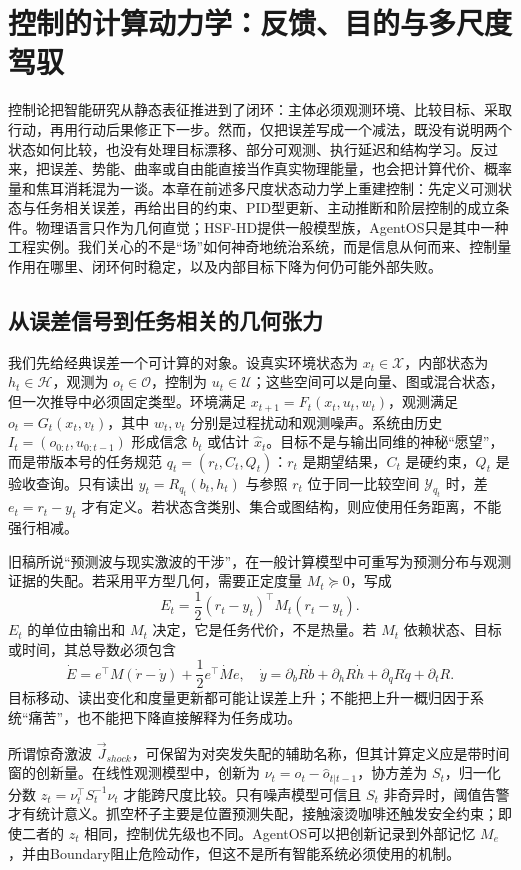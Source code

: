 \chapter{控制的计算动力学：反馈、目的与多尺度驾驭}
\label{chp:physics_of_cybernetics}

控制论把智能研究从静态表征推进到了闭环：主体必须观测环境、比较目标、采取行动，再用行动后果修正下一步。然而，仅把误差写成一个减法，既没有说明两个状态如何比较，也没有处理目标漂移、部分可观测、执行延迟和结构学习。反过来，把误差、势能、曲率或自由能直接当作真实物理能量，也会把计算代价、概率量和焦耳消耗混为一谈。本章在前述多尺度状态动力学上重建控制：先定义可测状态与任务相关误差，再给出目的约束、PID型更新、主动推断和阶层控制的成立条件。物理语言只作为几何直觉；HSF-HD提供一般模型族，AgentOS只是其中一种工程实例。我们关心的不是“场”如何神奇地统治系统，而是信息从何而来、控制量作用在哪里、闭环何时稳定，以及内部目标下降为何仍可能外部失败。

\section{从误差信号到任务相关的几何张力}
\label{sec:wiener_ghost_geometric_tension}

我们先给经典误差一个可计算的对象。设真实环境状态为 $x_t\in\mathcal X$，内部状态为 $h_t\in\mathcal H$，观测为 $o_t\in\mathcal O$，控制为 $u_t\in\mathcal U$；这些空间可以是向量、图或混合状态，但一次推导中必须固定类型。环境满足 $x_{t+1}=F_t(x_t,u_t,w_t)$，观测满足 $o_t=G_t(x_t,v_t)$，其中 $w_t,v_t$ 分别是过程扰动和观测噪声。系统由历史 $I_t=(o_{0:t},u_{0:t-1})$ 形成信念 $b_t$ 或估计 $\hat x_t$。目标不是与输出同维的神秘“愿望”，而是带版本号的任务规范 $q_t=(r_t,C_t,Q_t)$：$r_t$ 是期望结果，$C_t$ 是硬约束，$Q_t$ 是验收查询。只有读出 $y_t=R_{q_t}(b_t,h_t)$ 与参照 $r_t$ 位于同一比较空间 $\mathcal Y_{q_t}$ 时，差 $e_t=r_t-y_t$ 才有定义。若状态含类别、集合或图结构，则应使用任务距离，不能强行相减。

旧稿所说“预测波与现实激波的干涉”，在一般计算模型中可重写为预测分布与观测证据的失配。若采用平方型几何，需要正定度量 $M_t\succeq0$，写成
\[
 E_t=\frac12(r_t-y_t)^\top M_t(r_t-y_t).
\]
$E_t$ 的单位由输出和 $M_t$ 决定，它是任务代价，不是热量。若 $M_t$ 依赖状态、目标或时间，其总导数必须包含
\[
 \dot E=e^\top M(\dot r-\dot y)+\frac12e^\top\dot M e,
 \quad \dot y=\partial_bR\dot b+\partial_hR\dot h+\partial_qR\dot q+\partial_tR.
\]
目标移动、读出变化和度量更新都可能让误差上升；不能把上升一概归因于系统“痛苦”，也不能把下降直接解释为任务成功。

所谓惊奇激波 $\vec J_{shock}$，可保留为对突发失配的辅助名称，但其计算定义应是带时间窗的创新量。在线性观测模型中，创新为 $\nu_t=o_t-\hat o_{t|t-1}$，协方差为 $S_t$，归一化分数 $z_t=\nu_t^\top S_t^{-1}\nu_t$ 才能跨尺度比较。只有噪声模型可信且 $S_t$ 非奇异时，阈值告警才有统计意义。抓空杯子主要是位置预测失配，接触滚烫咖啡还触发安全约束；即使二者的 $z_t$ 相同，控制优先级也不同。AgentOS可以把创新记录到外部记忆 $M_e$，并由Boundary阻止危险动作，但这不是所有智能系统必须使用的机制。


